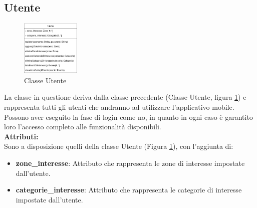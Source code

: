 \documentclass{article}
\begin{document}
\clearpage

\subsection{Utente}

\begin{figure}[htbp]
	\centering
	\includegraphics[width=0.25\textwidth]{Images/Utente-Class.png}
	\caption{Classe Utente}
	\label{fig:utente}
\end{figure}

La classe in questione deriva dalla classe precedente (Classe Utente, figura \ref{fig:utente}) e rappresenta tutti gli utenti che andranno ad utilizzare l'applicativo mobile.\\
Possono aver eseguito la fase di login come no, in quanto in ogni caso è garantito loro l'accesso completo alle funzionalità disponibili.\\

\textbf{Attributi:}\\
Sono a disposizione quelli della classe Utente (Figura \ref{fig:utente}), con l'aggiunta di:
\begin{itemize}
	\item \textbf{zone\_interesse}: Attributo che rappresenta le zone di interesse impostate dall'utente.
	\item \textbf{categorie\_interesse}: Attributo che rappresenta le categorie di interesse impostate dall'utente.\\
\end{itemize}
\end{document}
